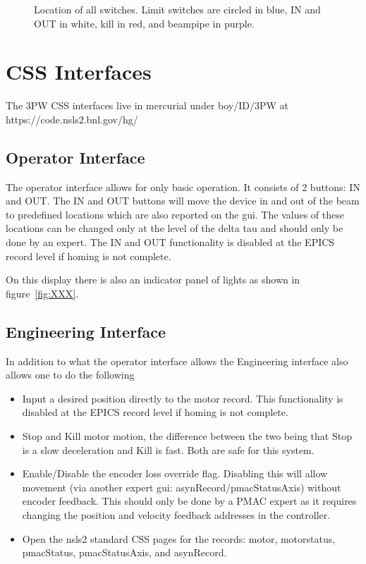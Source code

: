 \documentclass[12pt,letterpaper]{article}
\begin{document}
\begin{figure}
\begin{center}
\caption{Location of all switches.  Limit switches are circled in blue, IN and OUT in white, kill in red, and beampipe in purple.}
\label{fig:switches}
\end{center}
\end{figure}



\section{CSS Interfaces}
The 3PW CSS interfaces live in mercurial under boy/ID/3PW at https://code.nsls2.bnl.gov/hg/
\subsection{Operator Interface}
The operator interface allows for only basic operation.  It consists of 2 buttons: IN and OUT.  The IN and OUT buttons will move the device in and out of the beam to predefined locations which are also reported on the gui.  The values of these locations can be changed only at the level of the delta tau and should only be done by an expert.  The IN and OUT functionality is disabled at the EPICS record level if homing is not complete.

On this display there is also an indicator panel of lights as shown in figure~\ref{fig:XXX}.

\subsection{Engineering Interface}
In addition to what the operator interface allows the Engineering interface also allows one to do the following
\begin{itemize}
\item Input a desired position directly to the motor record.  This functionality is disabled at the EPICS record level if homing is not complete.
\item Stop and Kill motor motion, the difference between the two being that Stop is a slow deceleration and Kill is fast.  Both are safe for this system.
\item Enable/Disable the encoder loss override flag.  Disabling this will allow movement (via another expert gui: asynRecord/pmacStatusAxis) without encoder feedback.  This should only be done by a PMAC expert as it requires changing the position and velocity feedback addresses in the controller.
\item Open the nsls2 standard CSS pages for the records: motor, motorstatus, pmacStatus, pmacStatusAxis, and asynRecord.
\end{itemize}
\end{document}
